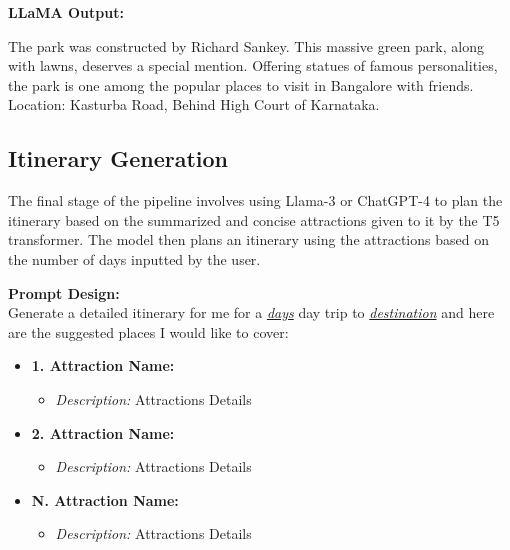 \documentclass[sigconf,authordraft]{acmart}
\begin{document}
    \begin{tcolorbox}[linewidth=1pt, innerleftmargin=15pt, innerrightmargin=15pt, innertopmargin=15pt, innerbottommargin=15pt]
      \textbf{LLaMA Output:}

      The park was constructed by Richard Sankey. This massive green park, along with lawns, deserves a special mention. Offering statues of famous personalities, the park is one among the popular places to visit in Bangalore with friends. Location: Kasturba Road, Behind High Court of Karnataka.
    \end{tcolorbox}

  \subsection{Itinerary Generation}
    The final stage of the pipeline involves using Llama-3 or ChatGPT-4 to plan the itinerary based on the summarized and concise attractions given to it by the T5 transformer. The model then plans an itinerary using the attractions based on the number of days inputted by the user.

    \begin{tcolorbox}[linewidth=1pt, innerleftmargin=15pt, innerrightmargin=15pt, innertopmargin=15pt, innerbottommargin=15pt]
      \textbf{Prompt Design:} \\

      Generate a detailed itinerary for me for a \underline{\textit{days}} day trip to  \underline{\textit{destination}} and here are the suggested places I would like to cover:

      \begin{itemize}
          \item \textbf{1. Attraction Name:}
          \begin{itemize}
              \item \textit{Description:} Attractions Details
          \end{itemize}
          \item \textbf{2. Attraction Name:}
          \begin{itemize}
              \item \textit{Description:} Attractions Details
          \end{itemize}
          \vspace{2\baselineskip} %
          \item \textbf{N. Attraction Name:}
          \begin{itemize}
              \item \textit{Description:} Attractions Details
          \end{itemize}
      \end{itemize}
    \end{tcolorbox}
\end{document}
